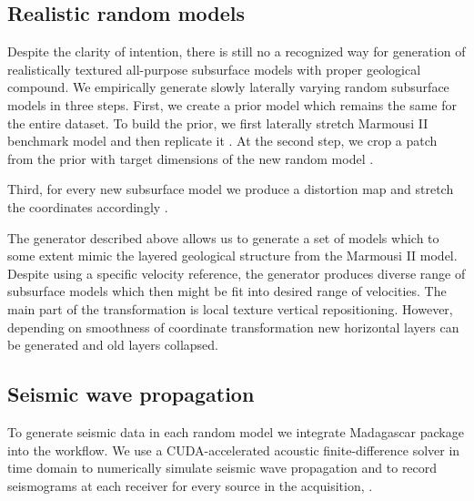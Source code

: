 \documentclass[manuscript]{geophysics}
\begin{document}
\subsection{Realistic random models}
Despite the clarity of intention, there is still no a recognized way for generation of realistically textured all-purpose subsurface models with proper geological compound. 
%
We empirically generate slowly laterally varying random subsurface models in three steps. First, we create a prior model which remains the same for the entire dataset. To build the prior, we first laterally stretch Marmousi II benchmark model and then replicate it . At the second step, we crop a patch from the prior with target dimensions of the new random model . 



Third, for every new subsurface model we produce a distortion map  and stretch the coordinates accordingly .


The generator described above allows us to generate a set of models which to some extent mimic the layered geological structure from the Marmousi II model. Despite using a specific velocity reference, the generator produces diverse range of subsurface models which then might be fit into desired range of velocities. The main part of the transformation is local texture vertical repositioning. However, depending on smoothness of coordinate transformation new horizontal layers can be generated and old layers collapsed.

\subsection{Seismic wave propagation}
To generate seismic data in each random model we integrate Madagascar package into the workflow. We use a CUDA-accelerated acoustic finite-difference solver in time domain to numerically simulate seismic wave propagation and to record seismograms at each receiver for every source in the acquisition, .
\end{document}
